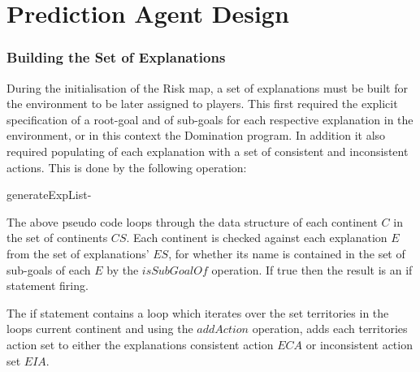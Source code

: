 \documentclass[parskip]{cs4rep}
\begin{document}
\section{Prediction Agent Design}

\subsubsection{Building the Set of Explanations}

During the initialisation of the Risk map, a set of explanations must be built for the environment to be later assigned to players. This first required the explicit specification of a root-goal and of sub-goals for each respective explanation in the environment, or in this context the Domination program. In addition it also required populating of each explanation with a set of consistent and inconsistent actions. This is done by the following operation:

\begin{pseudocode}[ruled]{generateExpList}{-}
\begin{algorithm}[H]
\end{algorithm}
\end{pseudocode}

The above pseudo code loops through the data structure of each continent $C$ in the set of continents $CS$. Each continent is checked against each explanation $E$ from the set of explanations' $ES$, for whether its name is contained in the set of sub-goals of each $E$ by the $isSubGoalOf$ operation. If true then the result is an if statement firing. 

The if statement contains a loop which iterates over the set territories in the loops current continent and using the $addAction$ operation, adds each territories action set to either the explanations consistent action $ECA$ or inconsistent action set $EIA$.
\end{document}
